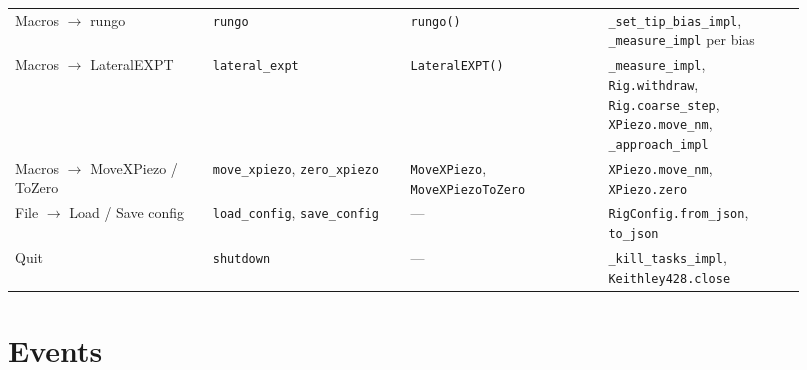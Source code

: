 \begin{longtable}{@{}>{\raggedright\arraybackslash}p{0.230\linewidth}>{\raggedright\arraybackslash}p{0.230\linewidth}>{\raggedright\arraybackslash}p{0.230\linewidth}>{\raggedright\arraybackslash}p{0.230\linewidth}@{}}
Macros $\rightarrow$ rungo & \texttt{rungo} & \texttt{rungo()} & \texttt{\_\discretionary{}{}{}set\_\discretionary{}{}{}tip\_\discretionary{}{}{}bias\_\discretionary{}{}{}impl}, \texttt{\_\discretionary{}{}{}measure\_\discretionary{}{}{}impl} per bias \\
Macros $\rightarrow$ LateralEXPT & \texttt{lateral\_\discretionary{}{}{}expt} & \texttt{Lateral\discretionary{}{}{}EXPT()} & \texttt{\_\discretionary{}{}{}measure\_\discretionary{}{}{}impl}, \texttt{Rig.\discretionary{}{}{}withdraw}, \texttt{Rig.\discretionary{}{}{}coarse\_\discretionary{}{}{}step}, \texttt{XPiezo.\discretionary{}{}{}move\_\discretionary{}{}{}nm}, \texttt{\_\discretionary{}{}{}approach\_\discretionary{}{}{}impl} \\
Macros $\rightarrow$ MoveXPiezo / ToZero & \texttt{move\_\discretionary{}{}{}xpiezo}, \texttt{zero\_\discretionary{}{}{}xpiezo} & \texttt{Move\discretionary{}{}{}XPiezo}, \texttt{Move\discretionary{}{}{}XPiezo\discretionary{}{}{}To\discretionary{}{}{}Zero} & \texttt{XPiezo.\discretionary{}{}{}move\_\discretionary{}{}{}nm}, \texttt{XPiezo.\discretionary{}{}{}zero} \\
File $\rightarrow$ Load / Save config & \texttt{load\_\discretionary{}{}{}config}, \texttt{save\_\discretionary{}{}{}config} & --- & \texttt{Rig\discretionary{}{}{}Config.\discretionary{}{}{}from\_\discretionary{}{}{}json}, \texttt{to\_\discretionary{}{}{}json} \\
Quit & \texttt{shutdown} & --- & \texttt{\_\discretionary{}{}{}kill\_\discretionary{}{}{}tasks\_\discretionary{}{}{}impl}, \texttt{Keithley428.\discretionary{}{}{}close} \\
\bottomrule
\end{longtable}
\normalsize

\section{Events}

